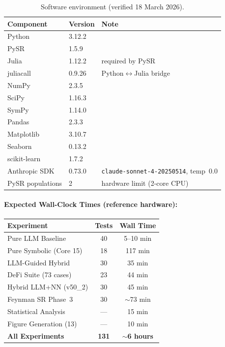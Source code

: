 \documentclass[11pt,a4paper]{article}
\begin{document}
\begin{table}[H]
\centering
\caption{Software environment (verified 18 March 2026).}
\label{tab:runtime_reproducibility}
\small
\begin{tabular}{@{}lll@{}}
\toprule
\textbf{Component} & \textbf{Version} & \textbf{Note} \\
\midrule
Python       & 3.12.2  & \\
PySR         & 1.5.9   & \\
Julia        & 1.12.2  & required by PySR \\
juliacall    & 0.9.26  & Python$\leftrightarrow$Julia bridge \\
NumPy        & 2.3.5   & \\
SciPy        & 1.16.3  & \\
SymPy        & 1.14.0  & \\
Pandas       & 2.3.3   & \\
Matplotlib   & 3.10.7  & \\
Seaborn      & 0.13.2  & \\
scikit-learn & 1.7.2   & \\
Anthropic SDK & 0.73.0 & \texttt{claude-sonnet-4-20250514}, temp~0.0 \\
\midrule
PySR populations & 2 & hardware limit (2-core CPU) \\
\bottomrule
\end{tabular}
\end{table}

\paragraph{Expected Wall-Clock Times (reference hardware):}
\begin{small}
\begin{tabular}{@{}lcc@{}}
\toprule
\textbf{Experiment} & \textbf{Tests} & \textbf{Wall Time} \\
\midrule
Pure LLM Baseline          & 40  & 5--10 min \\
Pure Symbolic (Core 15)    & 18  & 117 min \\
LLM-Guided Hybrid          & 30  & 35 min \\
DeFi Suite (73 cases)      & 23  & 44 min \\
Hybrid LLM+NN (v50\_2)     & 30  & 45 min \\
Feynman SR Phase~3         & 30  & $\sim$73 min \\
Statistical Analysis       & --- & 15 min \\
Figure Generation (13)     & --- & 10 min \\
\midrule
\textbf{All Experiments}   & \textbf{131} & \textbf{$\sim$6 hours} \\
\bottomrule
\end{tabular}
\end{small}
\end{document}
